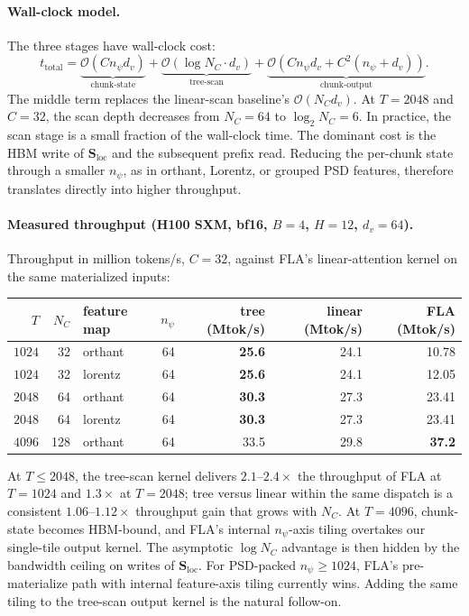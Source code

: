 \documentclass{article}
\newcommand{\1}{\bm{1}}
\def\mS{{\bm{S}}}
\def\gO{{\mathcal{O}}}
\newcommand{\seql}{T}
\theoremstyle{definition}
\begin{document}
\paragraph{Wall-clock model.} The three stages have wall-clock cost:
\[
  t_\text{total}
  =\underbrace{\gO(C n_\psi d_v)}_{\text{chunk-state}}
  +\underbrace{\gO(\log N_C\cdot d_v)}_{\text{tree-scan}}
  +\underbrace{\gO(C n_\psi d_v+C^2(n_\psi+d_v))}_{\text{chunk-output}}.
\]
The middle term replaces the linear-scan baseline's $\gO(N_C d_v)$. At $\seql{=}2048$ and $C{=}32$,
the scan depth decreases from $N_C{=}64$ to $\log_2 N_C{=}6$. In practice, the scan stage is a
small fraction of the wall-clock time. The dominant cost is the HBM write of
$\mS_\text{loc}$ and the subsequent prefix read. Reducing the per-chunk state through a smaller
$n_\psi$, as in orthant, Lorentz, or grouped PSD features, therefore translates directly into
higher throughput.

\paragraph{Measured throughput (H100 SXM, bf16, $B{=}4$, $H{=}12$, $d_v{=}64$).} Throughput in
million tokens/s, $C{=}32$, against FLA's linear-attention kernel on the same materialized inputs:

\begin{center}\footnotesize
  \begin{tabular}{rrlrrrr}
    \toprule
    $\seql$    & $N_C$ & feature map & $n_\psi$ & tree (Mtok/s) & linear (Mtok/s) & FLA (Mtok/s)  \\
    \midrule
    $1024$ & 32   & orthant     & 64  & \textbf{25.6} & 24.1            & 10.78         \\
    $1024$ & 32   & lorentz     & 64  & \textbf{25.6} & 24.1            & 12.05         \\
    $2048$ & 64   & orthant     & 64  & \textbf{30.3} & 27.3            & 23.41         \\
    $2048$ & 64   & lorentz     & 64  & \textbf{30.3} & 27.3            & 23.41         \\
    $4096$ & 128  & orthant     & 64  & 33.5          & 29.8            & \textbf{37.2} \\
    \bottomrule
  \end{tabular}
\end{center}
At $\seql\!\le\!2048$, the tree-scan kernel delivers $2.1$--$2.4\times$ the throughput of FLA at
$\seql{=}1024$ and $1.3\times$ at $\seql{=}2048$; tree versus linear within the same dispatch is a
consistent $1.06$--$1.12\times$ throughput gain that grows with $N_C$. At $\seql{=}4096$, chunk-state becomes HBM-bound,
and FLA's internal $n_\psi$-axis tiling overtakes our single-tile output kernel. The asymptotic
$\log N_C$ advantage is then hidden by the bandwidth ceiling on writes of $\mS_\text{loc}$. For
PSD-packed $n_\psi\!\ge\!1024$, FLA's pre-materialize path with internal feature-axis tiling
currently wins. Adding the same tiling to the tree-scan output kernel is the natural follow-on.
\end{document}
